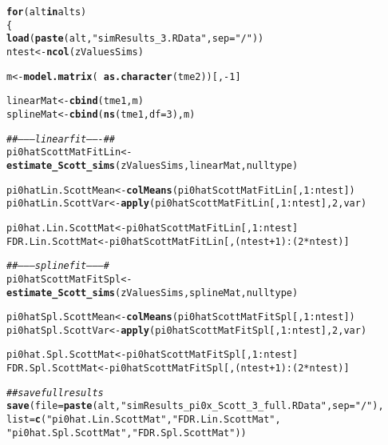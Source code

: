 \documentclass{article}\usepackage[]{graphicx}\usepackage[]{color}
\makeatletter
\newcommand{\hlnum}[1]{\textcolor[rgb]{0.686,0.059,0.569}{#1}}%
\newcommand{\hlstr}[1]{\textcolor[rgb]{0.192,0.494,0.8}{#1}}%
\newcommand{\hlcom}[1]{\textcolor[rgb]{0.678,0.584,0.686}{\textit{#1}}}%
\newcommand{\hlopt}[1]{\textcolor[rgb]{0,0,0}{#1}}%
\newcommand{\hlstd}[1]{\textcolor[rgb]{0.345,0.345,0.345}{#1}}%
\newcommand{\hlkwa}[1]{\textcolor[rgb]{0.161,0.373,0.58}{\textbf{#1}}}%
\newcommand{\hlkwb}[1]{\textcolor[rgb]{0.69,0.353,0.396}{#1}}%
\newcommand{\hlkwc}[1]{\textcolor[rgb]{0.333,0.667,0.333}{#1}}%
\newcommand{\hlkwd}[1]{\textcolor[rgb]{0.737,0.353,0.396}{\textbf{#1}}}%
\newenvironment{kframe}{%
 \def\at@end@of@kframe{}%
 \ifinner\ifhmode%
  \def\at@end@of@kframe{\end{minipage}}%
  \begin{minipage}{\columnwidth}%
 \fi\fi%
 \def\FrameCommand##1{\hskip\@totalleftmargin \hskip-\fboxsep
 \colorbox{shadecolor}{##1}\hskip-\fboxsep
     \hskip-\linewidth \hskip-\@totalleftmargin \hskip\columnwidth}%
 \MakeFramed {\advance\hsize-\width
   \@totalleftmargin\z@ \linewidth\hsize
   \@setminipage}}%
 {\par\unskip\endMakeFramed%
 \at@end@of@kframe}
\newenvironment{knitrout}{}{} %
\makeatother
\begin{document}
\begin{knitrout}
\color{fgcolor}\begin{kframe}
\begin{alltt}
\hlkwa{for}\hlstd{(alt} \hlkwa{in} \hlstd{alts)}
\hlstd{\{}
  \hlkwd{load}\hlstd{(}\hlkwd{paste}\hlstd{(alt,}\hlstr{"simResults_3.RData"}\hlstd{,}\hlkwc{sep}\hlstd{=}\hlstr{"/"}\hlstd{))}
  \hlstd{ntest} \hlkwb{<-} \hlkwd{ncol}\hlstd{(zValuesSims)}

  \hlstd{m} \hlkwb{<-} \hlkwd{model.matrix}\hlstd{(}\hlopt{~}\hlkwd{as.character}\hlstd{(tme2))[,}\hlopt{-}\hlnum{1}\hlstd{]}

  \hlstd{linearMat} \hlkwb{<-} \hlkwd{cbind}\hlstd{(tme1, m)}
  \hlstd{splineMat} \hlkwb{<-} \hlkwd{cbind}\hlstd{(}\hlkwd{ns}\hlstd{(tme1,}\hlkwc{df}\hlstd{=}\hlnum{3}\hlstd{), m)}

  \hlcom{##--------linear fit-------##}
  \hlstd{pi0hatScottMatFitLin} \hlkwb{<-} \hlkwd{estimate_Scott_sims}\hlstd{(zValuesSims, linearMat, nulltype)}

  \hlstd{pi0hatLin.ScottMean} \hlkwb{<-} \hlkwd{colMeans}\hlstd{(pi0hatScottMatFitLin[,}\hlnum{1}\hlopt{:}\hlstd{ntest])}
  \hlstd{pi0hatLin.ScottVar} \hlkwb{<-} \hlkwd{apply}\hlstd{(pi0hatScottMatFitLin[,}\hlnum{1}\hlopt{:}\hlstd{ntest],}\hlnum{2}\hlstd{,var)}

  \hlstd{pi0hat.Lin.ScottMat} \hlkwb{<-} \hlstd{pi0hatScottMatFitLin[,}\hlnum{1}\hlopt{:}\hlstd{ntest]}
  \hlstd{FDR.Lin.ScottMat} \hlkwb{<-} \hlstd{pi0hatScottMatFitLin[,(ntest}\hlopt{+}\hlnum{1}\hlstd{)}\hlopt{:}\hlstd{(}\hlnum{2}\hlopt{*}\hlstd{ntest)]}

  \hlcom{##---------spline fit---------#}
  \hlstd{pi0hatScottMatFitSpl} \hlkwb{<-} \hlkwd{estimate_Scott_sims}\hlstd{(zValuesSims, splineMat, nulltype)}

  \hlstd{pi0hatSpl.ScottMean} \hlkwb{<-} \hlkwd{colMeans}\hlstd{(pi0hatScottMatFitSpl[,}\hlnum{1}\hlopt{:}\hlstd{ntest])}
  \hlstd{pi0hatSpl.ScottVar} \hlkwb{<-} \hlkwd{apply}\hlstd{(pi0hatScottMatFitSpl[,}\hlnum{1}\hlopt{:}\hlstd{ntest],}\hlnum{2}\hlstd{,var)}

  \hlstd{pi0hat.Spl.ScottMat} \hlkwb{<-} \hlstd{pi0hatScottMatFitSpl[,}\hlnum{1}\hlopt{:}\hlstd{ntest]}
  \hlstd{FDR.Spl.ScottMat} \hlkwb{<-} \hlstd{pi0hatScottMatFitSpl[,(ntest}\hlopt{+}\hlnum{1}\hlstd{)}\hlopt{:}\hlstd{(}\hlnum{2}\hlopt{*}\hlstd{ntest)]}

  \hlcom{##save full results}
  \hlkwd{save}\hlstd{(}\hlkwc{file}\hlstd{=}\hlkwd{paste}\hlstd{(alt,}\hlstr{"simResults_pi0x_Scott_3_full.RData"}\hlstd{,}\hlkwc{sep}\hlstd{=}\hlstr{"/"}\hlstd{),}
       \hlkwc{list}\hlstd{=}\hlkwd{c}\hlstd{(}\hlstr{"pi0hat.Lin.ScottMat"}\hlstd{,} \hlstr{"FDR.Lin.ScottMat"}\hlstd{,}
              \hlstr{"pi0hat.Spl.ScottMat"}\hlstd{,} \hlstr{"FDR.Spl.ScottMat"}\hlstd{))}


\end{alltt}
\end{kframe}
\end{knitrout}
\end{document}
